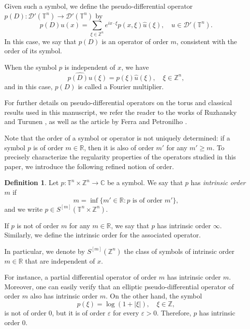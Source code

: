 \documentclass[11pt]{amsart}
\numberwithin{equation}{section}
\theoremstyle{definition}
\newtheorem{definition}[theorem]{Definition}
\begin{document}
	Given such a symbol, we define the pseudo-differential operator \( p(D): \mathscr{D}'(\mathbb{T}^n) \to \mathscr{D}'(\mathbb{T}^n) \) by  
	\[
	p(D)u(x) = \sum_{\xi \in \mathbb{Z}^n} e^{i x \cdot \xi} p(x, \xi) \widehat{u}(\xi), \quad u \in \mathscr{D}'(\mathbb{T}^n).
	\]
	In this case, we say that \( p(D) \) is an operator of order \( m \), consistent with the order of its symbol.
	
	When the symbol \( p \) is independent of \( x \), we have  
	\[
	\widehat{p(D)u}(\xi) = p(\xi) \widehat{u}(\xi), \quad \xi \in \mathbb{Z}^n,
	\]
	and in this case, \( p(D) \) is called a Fourier multiplier.  
	
	For further details on pseudo-differential operators on the torus and classical results used in this manuscript, we refer the reader to the works of Ruzhansky and Turunen \cite{RT2007_fourier_torus, RT2010_book, RT2010_jfaa}, as well as the article by Ferra and Petronilho \cite{FerraPetronilho2021}.  
	
	Note that the order of a symbol or operator is not uniquely determined: if a symbol \( p \) is of order \( m \in \mathbb{R} \), then it is also of order \( m' \) for any \( m' \geq m \). To precisely characterize the regularity properties of the operators studied in this paper, we introduce the following refined notion of order.  
	
	\begin{definition}
		Let \( p: \mathbb{T}^n \times \mathbb{Z}^n \to \mathbb{C} \) be a symbol. We say that \( p \) has \emph{intrinsic order} \( m \) if  
		\[
		m = \inf \{ m' \in \mathbb{R} : p \text{ is of order } m' \},
		\]
		and we write \( p \in S^{[m]}(\mathbb{T}^n \times \mathbb{Z}^n) \).  
		
		If \( p \) is not of order \( m \) for any \( m \in \mathbb{R} \), we say that \( p \) has intrinsic order \( \infty \). Similarly, we define the intrinsic order for the associated operator.  
		
		In particular, we denote by \( S^{[m]}(\mathbb{Z}^n) \) the class of symbols of intrinsic order \( m \in \mathbb{R} \) that are independent of \( x \).
	\end{definition}
	
	For instance, a partial differential operator of order \( m \) has intrinsic order \( m \). Moreover, one can easily verify that an elliptic pseudo-differential operator of order \( m \) also has intrinsic order \( m \). On the other hand, the symbol  
	\[
	p(\xi) = \log(1+|\xi|), \quad \xi \in \mathbb{Z},
	\]
	is not of order \( 0 \), but it is of order \( \varepsilon \) for every \( \varepsilon > 0 \). Therefore, \( p \) has intrinsic order \( 0 \).
    
\end{document}
